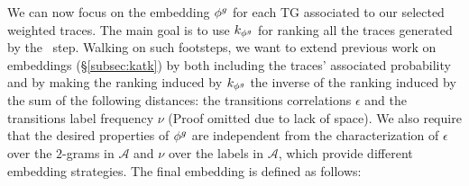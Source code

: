 {We can now focus on the embedding $\phi^{g}$ for each TG associated to our selected weighted traces. The main goal is to use $k_{\phi^{g}}$ for ranking all the traces generated by the \unravelling\ step. Walking on such footsteps, we  want to extend  previous work on embeddings (\S\ref{subsec:katk}) by both including the traces' associated probability and by making the ranking induced by $k_{\phi^{g}}$ the inverse of the ranking induced by the sum of the following distances: the transitions correlations $\epsilon$ and the transitions label frequency $\nu$ ({Proof omitted due to lack of space}). }
{We also require that the desired properties of $\phi^{g}$ are independent from the characterization of $\epsilon$ over the $2$-grams in $\mathcal{A}$ and $\nu$ over the labels in $\mathcal{A}$, which  provide different embedding strategies. } The final embedding is defined as follows:



